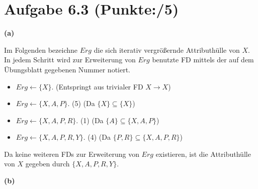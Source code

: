 \documentclass[11pt, a4paper]{article}
\newcommand{\blattnummer}{6}
\newcommand{\ppp}{5}
\newcommand{\rA}{\rightarrow}
\newcommand{\aufgabe}[2] {\section*{Aufgabe \blattnummer.#1 (Punkte:\qquad/#2)}}
\newcommand{\aufgabenteil}[1] {\textbf{(#1)}}
\begin{document}
\aufgabe{3}{\ppp}
\aufgabenteil{a}
\begin{adjustwidth}{20pt}{20pt}
	Im Folgenden bezeichne $Erg$ die sich iterativ vergrößernde Attributhülle von $X$. In jedem Schritt wird zur Erweiterung von $Erg$ benutzte FD mittels der auf
	dem Übungsblatt gegebenen Nummer notiert.
	\begin{itemize}
	\item $Erg \leftarrow \{ X\}$. (Entspringt aus trivialer FD $X \rA X$)
	\item $Erg \leftarrow \{ X,A,P\}$. (5) (Da $\{ X\} \subseteq \{ X\}$)
	\item $Erg \leftarrow \{ X,A,P,R\}$. (1) (Da $\{ A\} \subseteq \{ X,A,P\}$)
	\item $Erg \leftarrow \{ X,A,P,R,Y\}$. (4) (Da $\{ P,R\} \subseteq \{ X,A,P,R\}$)
	\end{itemize}
	Da keine weiteren FDs zur Erweiterung von $Erg$ existieren, ist die Attributhülle von $X$ gegeben durch $\{ X,A,P,R,Y\}$.
\end{adjustwidth}
\aufgabenteil{b}
\end{document}
